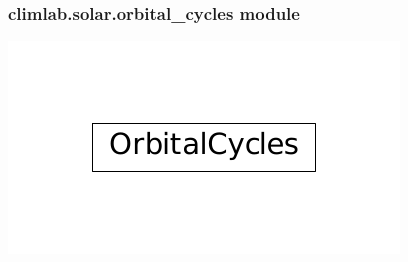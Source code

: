 \documentclass[a4paper,10pt,english]{sphinxmanual}
\begin{document}
\subsubsection{climlab.solar.orbital\_cycles module}
\label{api/climlab.solar:climlab-solar-orbital-cycles-module}
\includegraphics{inheritance-d20a99af4787ada459f19081acae8208cc46265a.pdf}
\label{api/climlab.solar:module-climlab.solar.orbital_cycles}
\end{document}
